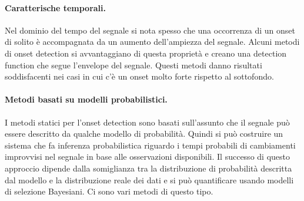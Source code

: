     \paragraph{Caratterische temporali.}
	Nel dominio del tempo del segnale si nota spesso che una occorrenza di un onset di solito \`e accompagnata da un aumento dell'ampiezza del segnale. Alcuni metodi di onset detection si avvantaggiano di questa propriet\`a e creano una detection function che segue l'envelope del segnale. Questi metodi danno risultati soddisfacenti nei casi in cui c'\`e un onset molto forte rispetto al sottofondo. 
    \paragraph{Metodi basati su modelli probabilistici.}
      I metodi statici per l'onset detection sono basati sull'assunto che il segnale pu\`o essere descritto da qualche modello di probabilit\`a. Quindi si pu\`o costruire un sistema che fa inferenza probabilistica riguardo i tempi probabili di cambiamenti improvvisi nel segnale in base alle osservazioni disponibili. Il successo di questo approccio dipende dalla somiglianza tra la distribuzione di probabilit\`a descritta dal modello e la distribuzione reale dei dati e si pu\`o quantificare usando modelli di selezione Bayesiani. Ci sono vari metodi di questo tipo.

% 


